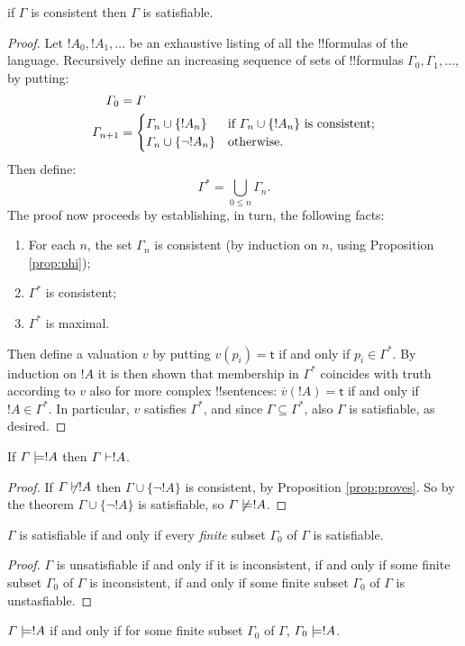 \documentclass[../../include/open-logic-section]{subfiles}
\begin{document}
\begin{thm} [Completeness]  if $\Gamma$ is
consistent then $\Gamma$ is satisfiable. \end{thm}

\begin{proof} Let $!A_0,!A_1,\ldots$ be an exhaustive listing of all the
!!{formula}s of the language. Recursively define an increasing sequence of
sets of !!{formula}s $\Gamma_0,\Gamma_1,\ldots$, by putting: \begin{align*}
\Gamma_0 & = \Gamma\\ \Gamma_{n+1} & = \begin{cases} \Gamma_n\cup\{!A_n\} &
\text{if $ \Gamma_n\cup\{!A_n\}$ is consistent;}\\
\Gamma_n\cup\{\lnot!A_n\} & \text{otherwise}. \end{cases} \end{align*} Then
define: \[ \Gamma^* = \bigcup_{0\le n}\Gamma_n. \] The proof now proceeds
by establishing, in turn, the following facts: \begin{enumerate} \item For
each $n$, the set $\Gamma_n$ is consistent (by induction on $n$, using
Proposition \ref{prop:phi}); \item $\Gamma^*$ is consistent; \item
$\Gamma^*$ is maximal. \end{enumerate} Then define a valuation $v$ by
putting $v(p_i) = \mathsf{t}$ if and only if $p_i \in\Gamma^*$. By
induction on $!A$ it is then shown that membership in $\Gamma^*$ coincides
with truth according to $v$ also for more complex !!{sentence}s:
$\overline{v}(!A) = \mathsf{t}$ if and only if $!A\in \Gamma^*$. In
particular, $v$ satisfies $\Gamma^*$, and since $\Gamma\subseteq \Gamma^*$,
also $\Gamma$ is satisfiable, as desired. \end{proof}

\begin{cor} If $\Gamma \Entails !A$ then $\Gamma \Proves !A$. \end{cor}
\begin{proof} If $\Gamma\Proves/ !A$ then $\Gamma\cup\{\lnot!A\}$ is
consistent, by Proposition \ref{prop:proves}. So by the theorem
$\Gamma\cup\{\lnot !A\}$ is satisfiable, so $\Gamma\Entails/ !A$.
\end{proof}

\begin{prop}   $\Gamma$ is
satisfiable if and only if every \emph{finite} subset $\Gamma_0$ of
$\Gamma$ is satisfiable. \end{prop}

\begin{proof} $\Gamma$ is unsatisfiable if and only if it is inconsistent,
if and only if some finite subset $\Gamma_0$ of $\Gamma$ is inconsistent,
if and only if some finite subset $\Gamma_0$ of $\Gamma$ is unstasfiable.
\end{proof}

\begin{cor} $\Gamma \Entails !A$ if and only if for some finite subset
$\Gamma_0$ of $\Gamma$, $\Gamma_0\Entails!A$. \end{cor} 
\end{document}
